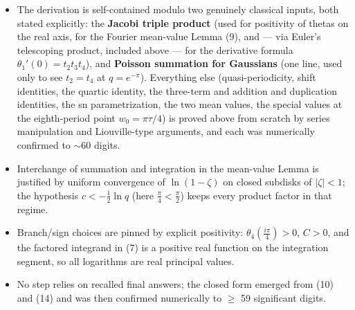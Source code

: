 \documentclass[11pt]{article}
\theoremstyle{remark}
\begin{document}
\begin{itemize}
\item The derivation is self-contained modulo two genuinely classical inputs, both stated explicitly: the \textbf{Jacobi triple product} (used for positivity of thetas on the real axis, for the Fourier mean-value Lemma (9), and --- via Euler's telescoping product, included above --- for the derivative formula $\theta_1'(0)=t_2t_3t_4$), and \textbf{Poisson summation for Gaussians} (one line, used only to see $t_2=t_4$ at $q=e^{-\pi}$). Everything else (quasi-periodicity, shift identities, the quartic identity, the three-term and addition and duplication identities, the sn parametrization, the two mean values, the special values at the eighth-period point $w_0=\pi\tau/4$) is proved above from scratch by series manipulation and Liouville-type arguments, and each was numerically confirmed to $\sim$60 digits.
\item Interchange of summation and integration in the mean-value Lemma is justified by uniform convergence of $\ln(1-\zeta)$ on closed subdisks of $|\zeta|<1$; the hypothesis $c<-\tfrac12\ln q$ (here $\tfrac\pi4<\tfrac\pi2$) keeps every product factor in that regime.
\item Branch/sign choices are pinned by explicit positivity: $\theta_4(\tfrac{i\pi}4)>0$, $C>0$, and the factored integrand in (7) is a positive real function on the integration segment, so all logarithms are real principal values.
\item No step relies on recalled final answers; the closed form emerged from (10) and (14) and was then confirmed numerically to $\ge$ 59 significant digits.
\end{itemize}
\end{document}
